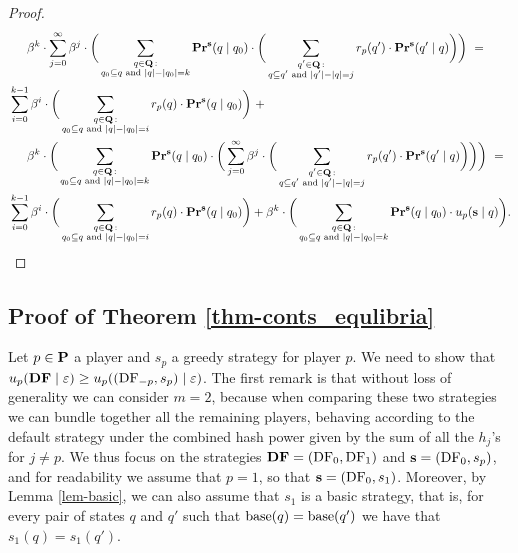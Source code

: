 \begin{proof}
\begin{align*}
& \hspace{15pt} \beta^k \cdot \sum_{j=0}^{\infty}\beta^{j} \cdot  \bigg(
\sum_{\substack{q \in \mathbf{Q} \,: \\ q_0 \subseteq q \text{ {\rm and} } |q| - |q_0| = k}} \mathbf{Pr}^{\mathbf{s}}(q \mid q_0) \cdot
\bigg(\sum_{\substack{q' \in \mathbf{Q} \,: \\ q \subseteq q' \text{ {\rm and} } |q'| - |q| = j}} r_p(q') \cdot 
\mathbf{Pr}^{\mathbf{s}}(q' \mid q)\bigg)\bigg)\ = \\
& \sum_{i=0}^{k-1} \beta^i \cdot \bigg(\sum_{\substack{q \in \mathbf{Q} \,: \\ q_0 \subseteq q \text{ {\rm and} } |q| - |q_0| = i}} r_p(q) \cdot \mathbf{Pr}^{\mathbf{s}}(q \mid q_0)\bigg) \ + \\
& \hspace{15pt}
 \beta^k \cdot \bigg(\sum_{\substack{q \in \mathbf{Q} \,: \\ q_0 \subseteq q \text{ {\rm and} } |q| - |q_0| = k}} \mathbf{Pr}^{\mathbf{s}}(q \mid q_0) \cdot \bigg(\sum_{j=0}^{\infty}\beta^{j} \cdot  \bigg(\sum_{\substack{q' \in \mathbf{Q} \,: \\ q \subseteq q' \text{ {\rm and} } |q'| - |q| = j}} r_p(q') \cdot 
\mathbf{Pr}^{\mathbf{s}}(q' \mid q)\bigg)\bigg)\bigg)\ = \\
& \sum_{i=0}^{k-1} \beta^i \cdot \bigg(\sum_{\substack{q \in \mathbf{Q} \,: \\ q_0 \subseteq q \text{ {\rm and} } |q| - |q_0| = i}} r_p(q) \cdot \mathbf{Pr}^{\mathbf{s}}(q \mid q_0)\bigg) +  \beta^k \cdot 
\bigg(\sum_{\substack{q \in \mathbf{Q} \,: \\ q_0 \subseteq q \text{ {\rm and} } |q| - |q_0| = k}}
\mathbf{Pr}^{\mathbf{s}}(q \mid q_0) \cdot u_p(\mathbf{s} \mid q)\bigg).
\end{align*}
\end{proof}


\subsection{Proof of Theorem \ref{thm-conts_equlibria}} 

Let $p \in \mathbf{P}$ a player and $s_p$ a greedy strategy for player $p$. We need to show that 
$u_p(\text{\rm {\bf DF}} \mid \varepsilon) \geq u_p( (\text{\rm DF}_{-p},s_p) \mid \varepsilon)$. The first remark is that without loss of generality we can consider 
$m = 2$, because when comparing these two strategies we can bundle together all the remaining players, behaving according to the default strategy
under the combined hash power given by the sum of all the $h_j$'s for $j \neq p$. We thus focus on the strategies 
$\text{\rm {\bf DF}} = (\text{\rm DF}_0,\text{\rm DF}_1)$ and $\mathbf{s} = (\text{\rm DF}_0,s_p)$, and for readability we assume that $p = 1$, so that $\mathbf{s} = (\text{\rm DF}_0,s_1)$.
Moreover, by Lemma \ref{lem-basic}, we can also assume that $s_1$ is a basic strategy, 
that is, for every  pair of states $q$ and $q'$ such that $\text{\rm base}(q) = \text{\rm base}(q')$ we have that $s_1(q) = s_1(q')$.

